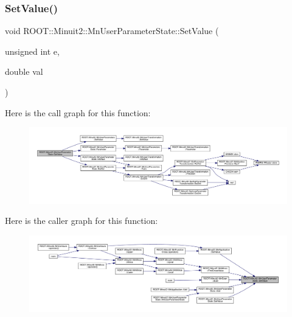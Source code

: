 \subsubsection{\texorpdfstring{SetValue()}{SetValue()}\hspace{0.1cm}{\footnotesize\ttfamily [1/4]}}
{\footnotesize\ttfamily void R\+O\+O\+T\+::\+Minuit2\+::\+Mn\+User\+Parameter\+State\+::\+Set\+Value (\begin{DoxyParamCaption}\item[{unsigned int}]{e,  }\item[{double}]{val }\end{DoxyParamCaption})}

Here is the call graph for this function\+:\nopagebreak
\begin{figure}[H]
\begin{center}
\leavevmode
\includegraphics[width=350pt]{d3/de0/classROOT_1_1Minuit2_1_1MnUserParameterState_a90490f6f1ab718c8dae1c895d36baf65_cgraph}
\end{center}
\end{figure}
Here is the caller graph for this function\+:\nopagebreak
\begin{figure}[H]
\begin{center}
\leavevmode
\includegraphics[width=350pt]{d3/de0/classROOT_1_1Minuit2_1_1MnUserParameterState_a90490f6f1ab718c8dae1c895d36baf65_icgraph}
\end{center}
\end{figure}
\mbox{\label{classROOT_1_1Minuit2_1_1MnUserParameterState_a90490f6f1ab718c8dae1c895d36baf65}} 
